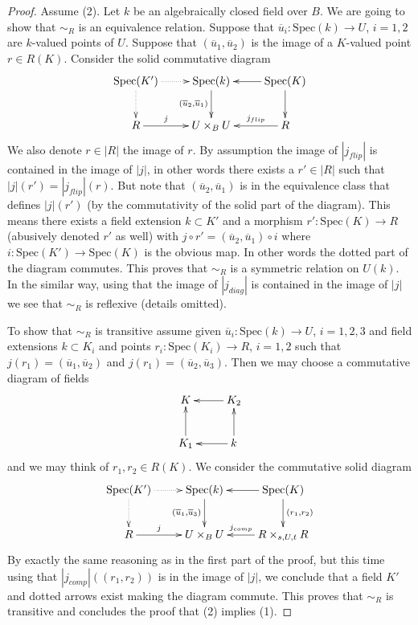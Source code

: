 \begin{proof}
Assume (2). Let $k$ be an algebraically closed field over $B$.
We are going to show that $\sim_R$ is an equivalence relation.
Suppose that $\overline{u}_i : \text{Spec}(k) \to U$, $i = 1, 2$
are $k$-valued points of $U$. Suppose that $(\overline{u}_1, \overline{u}_2)$
is the image of a $K$-valued point $r \in R(K)$. Consider the
solid commutative diagram
$$
\xymatrix{
\text{Spec}(K') \ar@{..>}[r] \ar@{..>}[d]
&
\text{Spec}(k) \ar[d]_{(\overline{u}_2, \overline{u}_1)} &
\text{Spec}(K) \ar[d] \ar[l] \\
R \ar[r]^-j &
U \times_B U &
R \ar[l]_-{j_{flip}}
}
$$
We also denote $r \in |R|$ the image of $r$.
By assumption the image of $|j_{flip}|$ is contained in the image of
$|j|$, in other words there exists a $r' \in |R|$ such that
$|j|(r') = |j_{flip}|(r)$. But note that $(\overline{u}_2, \overline{u}_1)$
is in the equivalence class that defines $|j|(r')$ (by the commutativity
of the solid part of the diagram). This means there exists a field
extension $k \subset K'$ and a morphism $r' : \text{Spec}(K) \to R$
(abusively denoted $r'$ as well) with
$j \circ r' = (\overline{u}_2, \overline{u}_1) \circ i$
where $i : \text{Spec}(K') \to \text{Spec}(K)$ is the obvious map.
In other words the dotted part of the diagram commutes.
This proves that $\sim_R$ is a symmetric relation on $U(k)$.
In the similar way, using that the image of $|j_{diag}|$ is contained
in the image of $|j|$ we see that $\sim_R$ is reflexive (details omitted).

\medskip\noindent
To show that $\sim_R$ is transitive assume given
$\overline{u}_i : \text{Spec}(k) \to U$, $i = 1, 2, 3$
and field extensions $k \subset K_i$ and points
$r_i : \text{Spec}(K_i) \to R$, $i = 1, 2$ such that
$j(r_1) = (\overline{u}_1, \overline{u}_2)$ and
$j(r_1) = (\overline{u}_2, \overline{u}_3)$. Then we may choose a
commutative diagram of fields
$$
\xymatrix{
K & \ar[l] K_2 \\
K_1 \ar[u] & k \ar[l] \ar[u]
}
$$
and we may think of $r_1, r_2 \in R(K)$. We consider the
commutative solid diagram
$$
\xymatrix{
\text{Spec}(K') \ar@{..>}[r] \ar@{..>}[d]
&
\text{Spec}(k) \ar[d]_{(\overline{u}_1, \overline{u}_3)} &
\text{Spec}(K) \ar[d]^{(r_1, r_2)} \ar[l]
\\
R \ar[r]^-j &
U \times_B U &
R \times_{s, U, t} R \ar[l]_-{j_{comp}}
}
$$
By exactly the same reasoning as in the first part of the proof, but
this time using that $|j_{comp}|((r_1, r_2))$ is in the image of $|j|$,
we conclude that a field $K'$ and dotted arrows exist making the
diagram commute. This proves that $\sim_R$ is transitive and concludes
the proof that (2) implies (1).


\end{proof}
